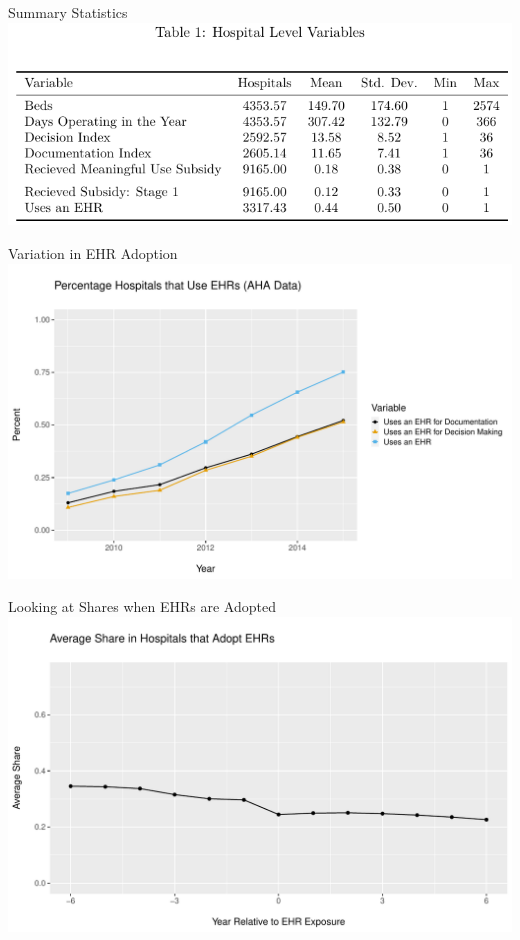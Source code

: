 \documentclass[10pt]{beamer}
\begin{document}
\begin{frame}{Summary Statistics}
\centering
\includegraphics[scale=.8]{Objects/sumstats_hospital_table.pdf}
    
\end{frame}

\begin{frame}{Variation in EHR Adoption}
\centering
\includegraphics[scale=.53]{Objects/TYP_plot_hospEHR_year.pdf}
\end{frame}

\begin{frame}{Looking at Shares when EHRs are Adopted}
    \centering
    \includegraphics[scale=.5]{Objects/relyear_treatment.pdf}
\end{frame}
\end{document}
